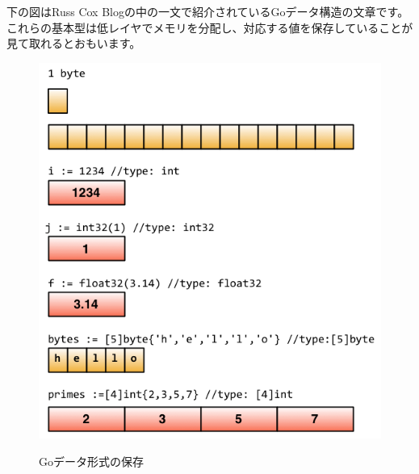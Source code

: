 下の図はRuss Cox Blogの中の一文で紹介されているGoデータ構造の文章です。これらの基本型は低レイヤでメモリを分配し、対応する値を保存していることが見て取れるとおもいます。

\begin{figure}[H]
  \includegraphics[width=14cm]{2.2.basic.png}
   \label{図2.1}
   \caption{Goデータ形式の保存}
\end{figure}
